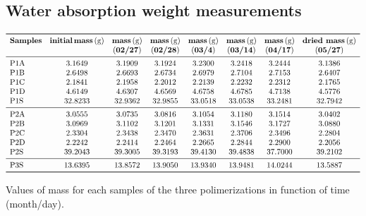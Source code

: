 \documentclass[a4paper, 11pt]{article}
\begin{document}
\begin{appendices}
\newpage
\section{Water absorption weight measurements}
\begin{table}[htp]
\centering
$
\begin{array}{lccccccc}
\toprule
\textbf{Samples} & \textbf{initial}\,\textbf{mass}\,(\text{g}) & \textbf{mass}\,(\text{g}) & \textbf{mass}\,(\text{g}) & \textbf{mass}\,(\text{g}) & \textbf{mass}\,(\text{g}) & \textbf{mass}\,(\text{g}) & \textbf{dried mass}\,(\text{g}) \\
& & (\textbf{02/27}) & (\textbf{02/28}) & (\textbf{03/4}) & (\textbf{03/14}) & (\textbf{04/17}) & (\textbf{05/27})\\
\midrule
\text{P1A} & 3.1649 & 3.1909 & 3.1924 & 3.2300 & 3.2418 & 3.2444 & 3.1386\\
\text{P1B} & 2.6498 & 2.6693 & 2.6734 & 2.6979 & 2.7104 & 2.7153 & 2.6407\\
\text{P1C} & 2.1841 & 2.1958 & 2.2012 & 2.2139 & 2.2232 & 2.2312 & 2.1765\\
\text{P1D} & 4.6149 & 4.6307 & 4.6569 & 4.6758 & 4.6785 & 4.7138 & 4.5776\\
\text{P1S} & 32.8233 & 32.9362 & 32.9855 & 33.0518 & 33.0538 & 33.2481 & 32.7942\\
\midrule
\text{P2A} & 3.0555 & 3.0735 & 3.0816 & 3.1054 & 3.1180 & 3.1514 & 3.0402\\
\text{P2B} & 3.0969 & 3.1102 & 3.1201 & 3.1331 & 3.1546 & 3.1727 & 3.0880\\
\text{P2C} & 2.3304 & 2.3438 & 2.3470 & 2.3631 & 2.3706 & 2.3496 & 2.2804\\
\text{P2D} & 2.2242 & 2.2414 & 2.2464 & 2.2665 & 2.2844 & 2.2900 & 2.2056\\
\text{P2S} & 39.2043 & 39.3005  & 39.3193 & 39.4130 & 39.4838 & 37.7000 & 39.2102\\
\midrule
\text{P3S} & 13.6395 & 13.8572 & 13.9050 & 13.9340 & 13.9481 & 14.0244 & 13.5887\\
\bottomrule
\end{array}
$
\caption{Values of mass for each samples of the three polimerizations in function of time (month/day).}
\label{tab:water}
\end{table}
\end{appendices}
\end{document}
